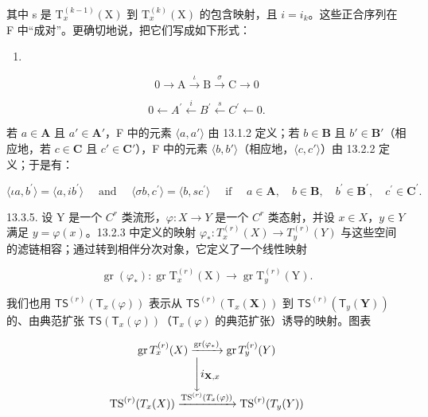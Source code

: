 其中 s 是 \(\mathrm{T}_{x}^{(k-1)}(\mathrm{X})\) 到 \(\mathrm{T}_{x}^{(k)}(\mathrm{X})\) 的包含映射，且 \(i=i_{k}\)。这些正合序列在 F 中“成对”。更确切地说，把它们写成如下形式：

\begin{enumerate}
\def\labelenumi{(\roman{enumi})}
\tightlist
\item
\end{enumerate}

\[
0 \rightarrow \mathrm{A} \xrightarrow {\iota} \mathrm{B} \xrightarrow {\sigma} \mathrm{C} \rightarrow 0\tag{ii}
\]

\[
0 \leftarrow A ^ {\prime} \stackrel {i} {\leftarrow} B ^ {\prime} \stackrel {s} {\leftarrow} C ^ {\prime} \leftarrow 0.
\]

若 \(a \in \mathbf{A}\) 且 \(a' \in \mathbf{A}'\)，F 中的元素 \(\langle a, a' \rangle\) 由 13.1.2 定义；若 \(b \in \mathbf{B}\) 且 \(b' \in \mathbf{B}'\)（相应地，若 \(c \in \mathbf{C}\) 且 \(c' \in \mathbf{C}'\)），F 中的元素 \(\langle b, b' \rangle\)（相应地，\(\langle c, c' \rangle\)）由 13.2.2 定义；于是有：

\[
\langle \iota a, b ^ {\prime} \rangle = \langle a, i b ^ {\prime} \rangle \quad \text { and } \quad \langle \sigma b, c ^ {\prime} \rangle = \langle b, s c ^ {\prime} \rangle \quad \text { if } \quad a \in \mathbf {A}, \quad b \in \mathbf {B}, \quad b ^ {\prime} \in \mathbf {B} ^ {\prime}, \quad c ^ {\prime} \in \mathbf {C} ^ {\prime}.
\]

13.3.5. 设 Y 是一个 \(C^{r}\) 类流形，\(\varphi: X \to Y\) 是一个 \(C^{r}\) 类态射，并设 \(x \in X\)，\(y \in Y\) 满足 \(y = \varphi(x)\)。13.2.3 中定义的映射 \(\varphi_{*}: T_{x}^{(r)}(X) \to T_{y}^{(r)}(Y)\) 与这些空间的滤链相容；通过转到相伴分次对象，它定义了一个线性映射

\[
\operatorname{gr} \left(\varphi_ {*}\right): \operatorname{gr} \mathrm{T} _ {x} ^ {(r)} (\mathrm{X}) \rightarrow \operatorname{gr} \mathrm{T} _ {y} ^ {(r)} (\mathrm{Y}).
\]

我们也用 \(\mathsf{TS}^{(r)}(\mathsf{T}_x(\varphi))\) 表示从 \(\mathsf{TS}^{(r)}(\mathsf{T}_x(\mathbf{X}))\) 到 \(\mathsf{TS}^{(r)}(\mathsf{T}_y(\mathbf{Y}))\) 的、由典范扩张 \(\mathsf{TS}(\mathsf{T}_x(\varphi))\)（\(\mathsf{T}_x(\varphi)\) 的典范扩张）诱导的映射。图表

\[
\begin{array}{c} \operatorname{gr} T _ {x} ^ {(r)} (X) \xrightarrow {\operatorname{gr} (\varphi_ {*})} \operatorname{gr} T _ {y} ^ {(r)} (Y) \\ \Biggl \downarrow i _ {\mathbf {X}, x} \\ \operatorname{TS} ^ {(r)} (T _ {x} (X)) \xrightarrow {\operatorname{TS} ^ {(r)} (T _ {x} (\varphi))} \operatorname{TS} ^ {(r)} (T _ {y} (Y)) \end{array}
\]

